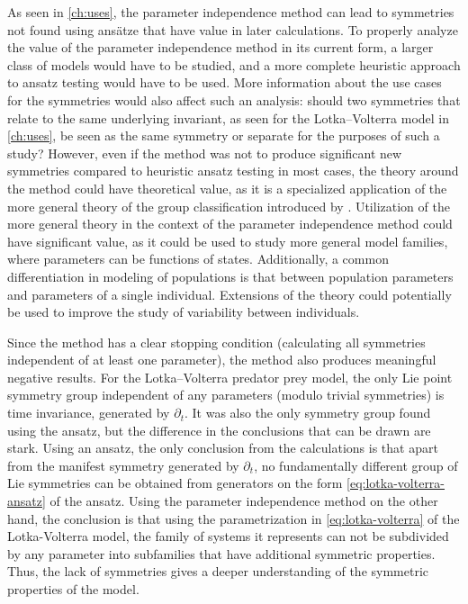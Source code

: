 As seen in \cref{ch:uses}, the parameter independence method can lead to symmetries not found using ansätze that have value in later calculations.
To properly analyze the value of the parameter independence method in its current form, a larger class of models would have to be studied, and a more complete heuristic approach to ansatz testing would have to be used.
More information about the use cases for the symmetries would also affect such an analysis: should two symmetries that relate to the same underlying invariant, as seen for the Lotka--Volterra model in \cref{ch:uses}, be seen as the same symmetry or separate for the purposes of such a study?
However, even if the method was not to produce significant new symmetries compared to heuristic ansatz testing in most cases, the theory around the method could have theoretical value, as it is a specialized application of the more general theory of the group classification introduced by \citeauthor{ovsiannikov1982group} \cite{ovsiannikov1982group}.
Utilization of the more general theory in the context of the parameter independence method could have significant value, as it could be used to study more general model families, where parameters can be functions of states.
Additionally, a common differentiation in modeling of populations is that between population parameters and parameters of a single individual.
Extensions of the theory could potentially be used to improve the study of variability between individuals.

Since the method has a clear stopping condition (calculating all symmetries independent of at least one parameter), the method also produces meaningful negative results.
For the Lotka--Volterra predator prey model, the only Lie point symmetry group independent of any parameters (modulo trivial symmetries) is time invariance, generated by \(\partial_t\).
It was also the only symmetry group found using the ansatz, but the difference in the conclusions that can be drawn are stark.
Using an ansatz, the only conclusion from the calculations is that apart from the manifest symmetry generated by \(\partial_t\), no fundamentally different group of Lie symmetries can be obtained from generators on the form \cref{eq:lotka-volterra-ansatz} of the ansatz.
Using the parameter independence method on the other hand, the conclusion is that using the parametrization in \cref{eq:lotka-volterra} of the Lotka-Volterra model, the family of systems it represents can not be subdivided by any parameter into subfamilies that have additional symmetric properties.
Thus, the lack of symmetries gives a deeper understanding of the symmetric properties of the model.

